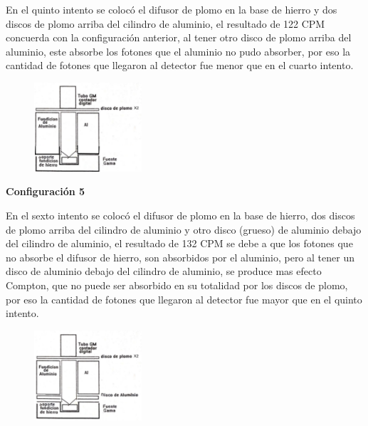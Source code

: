 \documentclass[a4paper]{article}
\begin{document}

    \indent En el quinto intento se colocó el difusor de plomo en la base de hierro y dos discos de plomo arriba del cilindro de aluminio, el resultado de 122 CPM concuerda con la configuración anterior, al tener otro disco de plomo arriba del aluminio, este absorbe los fotones que el aluminio no pudo absorber, por eso la cantidad de fotones que llegaron al detector fue menor que en el cuarto intento.\\

    \begin{figure}[h!]
        \centering
        \includegraphics[width=4cm]{../imagenes/imagen5.png}
        \vspace{-5mm}
    \end{figure}

    \begin{center}
        \textbf{Configuración 5}
    \end{center}

    \indent En el sexto intento se colocó el difusor de plomo en la base de hierro, dos discos de plomo arriba del cilindro de aluminio y otro disco (grueso) de aluminio debajo del cilindro de aluminio, el resultado de 132 CPM  se debe a que los fotones que no absorbe el difusor de hierro, son absorbidos por el aluminio, pero al tener un disco de aluminio debajo del cilindro de aluminio, se produce mas efecto Compton, que no puede ser absorbido en su totalidad por los discos de plomo, por eso la cantidad de fotones que llegaron al detector fue mayor que en el quinto intento.\\

    \begin{figure}[h!]
        \centering
        \includegraphics[width=4cm]{../imagenes/imagen6.png}
        \vspace{-5mm}
    \end{figure}
\end{document}
